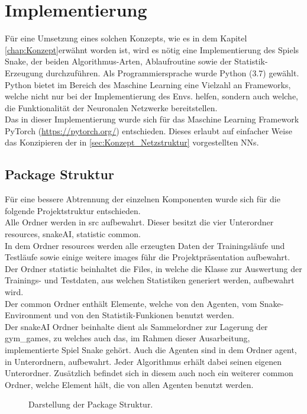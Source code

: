 \chapter{Implementierung} \label{chap:Implementierung}
\graphicspath{{Abbildungen/Implementierung/}}
Für eine Umsetzung eines solchen Konzepts, wie es in dem Kapitel \ref{chap:Konzept}erwähnt worden ist, wird es nötig eine Implementierung des Spiels Snake, der beiden Algorithmus-Arten, Ablaufroutine sowie der Statistik-Erzeugung durchzuführen. Als Programmiersprache wurde Python (3.7) gewählt.\\
Python bietet im Bereich des Maschine Learning eine Vielzahl an Frameworks, welche nicht nur bei der Implementierung des Envs. helfen, sondern auch welche, die Funktionalität der Neuronalen Netzwerke bereitstellen.\\
Das in dieser Implementierung wurde sich für das Maschine Learning Framework PyTorch (\url{https://pytorch.org/}) entschieden. Dieses erlaubt auf einfacher Weise das Konzipieren der in \ref{sec:Konzept_Netzstruktur} vorgestellten NNs.

\section{Package Struktur}
Für eine bessere Abtrennung der einzelnen Komponenten wurde sich für die folgende Projektstruktur entschieden. 
\\Alle Ordner werden in src aufbewahrt. Dieser besitzt die vier Unterordner resources, snakeAI, statistic common.\\
In dem Ordner resources werden alle erzeugten Daten der Trainingsläufe und Testläufe sowie einige weitere images führ die Projektpräsentation aufbewahrt.\\
Der Ordner statistic beinhaltet die Files, in welche die Klasse zur Auswertung der Trainings- und Testdaten, aus welchen Statistiken generiert werden, aufbewahrt wird.\\
Der common Ordner enthält Elemente, welche von den Agenten, vom Snake-Environment und von den Statistik-Funkionen benutzt werden.\\
Der snakeAI Ordner beinhalte dient als Sammelordner zur Lagerung der gym\_games, zu welches auch das, im Rahmen dieser Ausarbeitung, implementierte Spiel Snake gehört. Auch die Agenten sind in dem Ordner agent, in Unterordnern, aufbewahrt. Jeder Algorithmus erhält dabei seinen eigenen Unterordner. Zusätzlich befindet sich in diesem auch noch ein weiterer common Ordner, welche Element hält, die von allen Agenten benutzt werden.
\begin{figure}[H]
	\centering
	\def\svgscale{0.1}
	
	\caption[Package Struktur]{Darstellung der Package Struktur.}
	\label{fig:Package_Struktur}
\end{figure}

